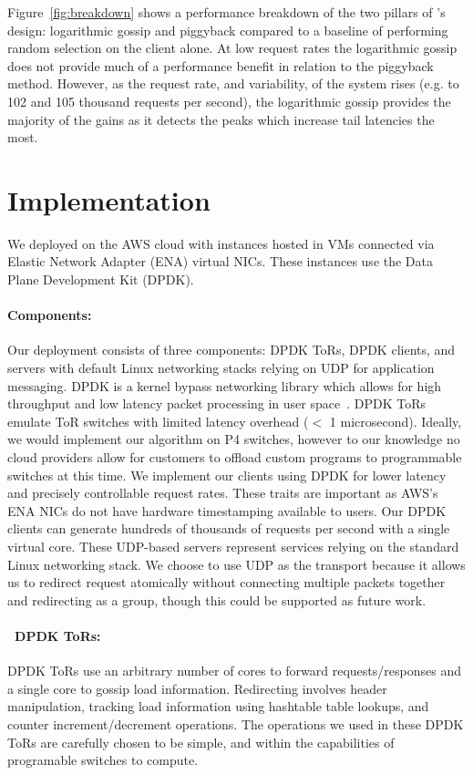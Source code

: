 Figure~\ref{fig:breakdown} shows a performance breakdown of the two pillars of
\daronpon's design: logarithmic gossip and piggyback compared to a baseline of performing random selection on the client alone. 
%
At low request rates the logarithmic gossip does not provide much of a performance benefit in relation to the piggyback method. 
%
However, as the request rate, and variability, of the system rises (e.g. to 102 and 105
thousand requests per second), the logarithmic gossip provides the majority of
the gains as it detects the peaks which increase tail latencies the most.

\section{Implementation}

We deployed \daronpon on the AWS cloud with instances hosted in VMs connected via Elastic Network Adapter (ENA) virtual NICs. 
%
These instances use the Data Plane Development Kit (DPDK).

\paragraph{Components:} Our deployment consists of three components: DPDK ToRs,
DPDK clients, and servers with default Linux networking stacks relying on UDP
for application messaging. DPDK is a kernel bypass networking library which
allows for high throughput and low latency packet processing in user
space~\cite{dpdk}. DPDK ToRs emulate ToR switches with limited latency overhead
($<$ 1 microsecond).  Ideally, we would implement our algorithm on P4 switches,
however to our knowledge no cloud providers allow for customers to offload
custom programs to programmable switches at this time.  We implement our
clients using DPDK for lower latency and precisely controllable request rates.
These traits are important as AWS's ENA NICs do not have hardware timestamping
available to users.  Our DPDK clients can generate hundreds of thousands of
requests per second with a single virtual core. These UDP-based servers
represent services relying on the standard Linux networking stack. We choose to
use UDP as the transport because it allows us to redirect request atomically
without connecting multiple packets together and redirecting as a group, though
this could be supported as future work.

\paragraph{\daronpon\ DPDK ToRs:} DPDK ToRs use an arbitrary number
of cores to forward requests/responses and a single core to gossip
load information. Redirecting involves header manipulation, tracking
load information using hashtable table lookups, and counter
increment/decrement operations. The operations we used in these DPDK
ToRs are carefully chosen to be simple, and within the capabilities of
programable switches to compute.

